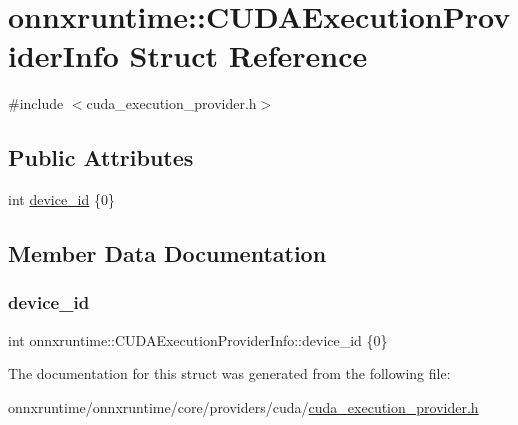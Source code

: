 \hypertarget{structonnxruntime_1_1CUDAExecutionProviderInfo}{}\section{onnxruntime\+:\+:C\+U\+D\+A\+Execution\+Provider\+Info Struct Reference}
\label{structonnxruntime_1_1CUDAExecutionProviderInfo}


{\ttfamily \#include $<$cuda\+\_\+execution\+\_\+provider.\+h$>$}

\subsection*{Public Attributes}
\begin{DoxyCompactItemize}
\item 
int \mbox{\hyperlink{structonnxruntime_1_1CUDAExecutionProviderInfo_a90d6796b0ed9e2d17773fbc96521d025}{device\+\_\+id}} \{0\}
\end{DoxyCompactItemize}


\subsection{Member Data Documentation}
\mbox{\label{structonnxruntime_1_1CUDAExecutionProviderInfo_a90d6796b0ed9e2d17773fbc96521d025}} 
\subsubsection{\texorpdfstring{device\+\_\+id}{device\_id}}
{\footnotesize\ttfamily int onnxruntime\+::\+C\+U\+D\+A\+Execution\+Provider\+Info\+::device\+\_\+id \{0\}}



The documentation for this struct was generated from the following file\+:\begin{DoxyCompactItemize}
\item 
onnxruntime/onnxruntime/core/providers/cuda/\mbox{\hyperlink{cuda__execution__provider_8h}{cuda\+\_\+execution\+\_\+provider.\+h}}\end{DoxyCompactItemize}
